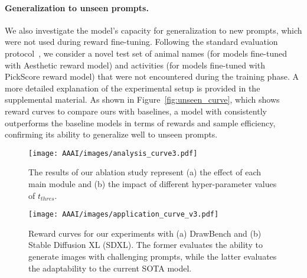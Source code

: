 \paragraph{Generalization to unseen prompts.}
We also investigate the model's capacity for generalization to new prompts, which were not used during reward fine-tuning. Following the standard evaluation protocol~\cite{ddpo, alignprop}, we consider a novel test set of animal names (for models fine-tuned with Aesthetic reward model) and activities (for models fine-tuned with PickScore reward model) that were not encountered during the training phase. A more detailed explanation of the experimental setup is provided in the supplemental material. As shown in Figure~\ref{fig:unseen_curve}, which shows reward curves to compare ours with baselines, a model with \metabbr consistently outperforms the baseline models in terms of rewards and sample efficiency, confirming its ability to generalize well to unseen prompts.  

\begin{figure*}[!t]
  \centering
  \texttt{[image: AAAI/images/analysis\_curve3.pdf]}
  \caption{
  The results of our ablation study represent (a) the effect of each main module and (b) the impact of different hyper-parameter values of $t_{thres}$. 
  }
  \label{fig:analysis_curve}
\end{figure*}


\begin{figure}[t]
  \centering
  \texttt{[image: AAAI/images/application\_curve\_v3.pdf]}
  \caption{Reward curves for our experiments with (a) DrawBench and (b) Stable Diffusion XL (SDXL). The former evaluates the ability to generate images with challenging prompts, while the latter evaluates the adaptability to the current SOTA model.}
  \label{fig:application_curve}
\end{figure}


